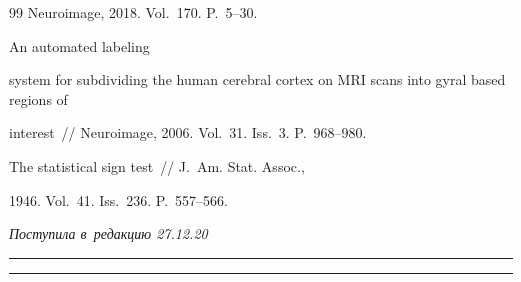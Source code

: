 {{\begin{thebibliography}{99}
Neuroimage, 2018. Vol.~170. P.~5--30.


 An automated labeling 

system for subdividing the human cerebral cortex on MRI scans into gyral based regions of 

interest~/\!\!/ Neuroimage, 2006. Vol.~31. Iss.~3. P.~968--980.


 The statistical sign test~/\!\!/ J.~Am. Stat. Assoc., 

1946. Vol.~41. Iss.~236. P.~557--566.

     \end{thebibliography}

} }





\vspace*{-3pt}



\hfill{\small\textit{Поступила в~редакцию 27.12.20}}









\vspace*{6pt}



\hrule



\vspace*{2pt}









\hrule



\vspace*{8pt}



\def\tit{METHODS FOR COMPARING COMPETING HYPOTHESES 

IN~HYPOTHESIS-ORIENTED SYSTEMS}



\def\titkol{Methods for comparing competing hypotheses 

in~hypothesis-oriented systems}







